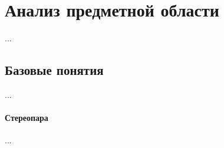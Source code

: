 \chapter{Анализ предметной области}
...
\section{Базовые понятия}
...
\subsubsection{Стереопара}
...